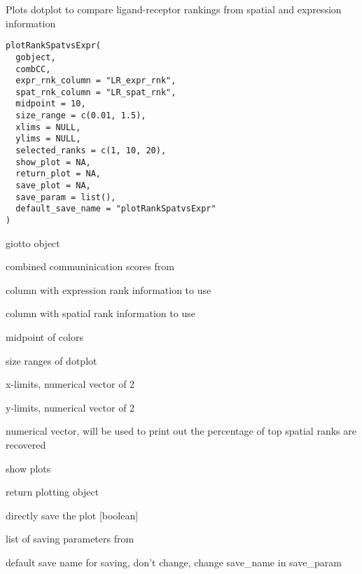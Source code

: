 \documentclass[a4paper]{book}
\begin{document}
%
\begin{Description}\relax
Plots dotplot to compare ligand-receptor rankings from spatial and expression information
\end{Description}
%
\begin{Usage}
\begin{verbatim}
plotRankSpatvsExpr(
  gobject,
  combCC,
  expr_rnk_column = "LR_expr_rnk",
  spat_rnk_column = "LR_spat_rnk",
  midpoint = 10,
  size_range = c(0.01, 1.5),
  xlims = NULL,
  ylims = NULL,
  selected_ranks = c(1, 10, 20),
  show_plot = NA,
  return_plot = NA,
  save_plot = NA,
  save_param = list(),
  default_save_name = "plotRankSpatvsExpr"
)
\end{verbatim}
\end{Usage}
%
\begin{Arguments}
\begin{ldescription}
\item[\code{gobject}] giotto object

\item[\code{combCC}] combined communinication scores from 

\item[\code{expr\_rnk\_column}] column with expression rank information to use

\item[\code{spat\_rnk\_column}] column with spatial rank information to use

\item[\code{midpoint}] midpoint of colors

\item[\code{size\_range}] size ranges of dotplot

\item[\code{xlims}] x-limits, numerical vector of 2

\item[\code{ylims}] y-limits, numerical vector of 2

\item[\code{selected\_ranks}] numerical vector, will be used to print out the percentage of top spatial ranks are recovered

\item[\code{show\_plot}] show plots

\item[\code{return\_plot}] return plotting object

\item[\code{save\_plot}] directly save the plot [boolean]

\item[\code{save\_param}] list of saving parameters from 

\item[\code{default\_save\_name}] default save name for saving, don't change, change save\_name in save\_param
\end{ldescription}
\end{Arguments}
\end{document}
